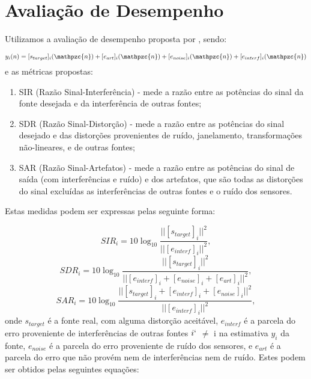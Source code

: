 \section{Avaliação de Desempenho}\label{metrics}
    Utilizamos a avaliação de desempenho proposta por \cite{performance}, sendo:
    
    \begin{equation}
         y_i(n) = [s_{target}]_i(\mathpzc{n})  + [e_{art}]_i(\mathpzc{n})  +  [e_{noise}]_i(\mathpzc{n}) +  [e_{interf}]_i(\mathpzc{n})
    \end{equation}
    e as métricas propostas:
    
    \begin{enumerate}
        \item SIR (Razão Sinal-Interferência) - mede a razão entre as potências do sinal da fonte desejada e da interferência de outras fontes;
        \item SDR (Razão Sinal-Distorção) - mede a razão entre as potências do sinal desejado e das distorções provenientes de ruído, janelamento, transformações não-lineares, e de outras fontes;
        \item SAR (Razão Sinal-Artefatos) - mede a razão entre as potências do sinal de saída (com interferências e ruído) e dos artefatos, que são todas as distorções do sinal excluídas as interferências de outras fontes e o ruído dos sensores.
    \end{enumerate}
    
    Estas medidas podem ser expressas pelas seguinte forma:
    
    \begin{equation}
        \label{eq:sir}
        SIR_i = 10\log_{10} \frac{|| [s_{target}]_i ||^2}{|| [e_{interf}]_i ||^2},
    \end{equation}
    \medskip
    \begin{equation}
        \label{eq:sdr}
        SDR_i = 10\log_{10} \frac{|| [s_{target}]_i ||^2}{|| [e_{interf}]_i + [e_{noise}]_i + [e_{art}]_i   ||^2},
    \end{equation}
    \medskip
    \begin{equation}
        \label{eq:sar}
        SAR_i = 10\log_{10} \frac{|| [s_{target}]_i + [e_{interf}]_i + [e_{noise}]_i ||^2}{|| [e_{interf}]_i ||^2},
    \end{equation}
    onde $s_{target}$ é a fonte real, com alguma distorção aceitável, $e_{interf}$  é a parcela do erro
proveniente de interferências de outras fontes $i`$ $\neq$ i na estimativa $y_i$ da fonte, $e_{noise}$
é a parcela do erro proveniente de ruído dos sensores, e $e_{art}$ é a parcela do erro que não provém nem de interferências nem de ruído. Estes podem ser obtidos pelas seguintes equações:


